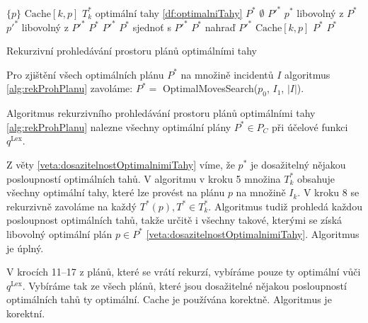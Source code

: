 \begin{algorithm}[H]
  \begin{algorithmic}[1]
      \State \Return $\{ p \}$
      \State \Return $\text{Cache}[k, p]$
    \EndIf
    \State $T^*_k$ \gets optimální tahy \ref{df:optimalniTahy}
    \State $P^*$ \gets $\emptyset$
      \State $P'^*$ \gets {}
      \State $p^*$ \gets libovolný z $P^*$
      \State $p'^*$ \gets libovolný z $P'^*$
        \State $P^*$ \gets $P'^*$ 
        \State $P^*$ sjednoť s $P'^*$
        \State $P^*$ nahraď $P'^*$
      \EndIf
    \EndFor
    \State $\text{Cache}[k, p]$ \gets $P^*$
    \State \Return $P^*$
  \EndFunction
  \end{algorithmic}
  \caption{Rekurzivní prohledávání prostoru plánů optimálními tahy}
  \label{alg:rekProhPlanu}
\end{algorithm}

Pro zjištění všech optimálních plánu $P^*$ na množině incidentů $I$ algoritmus \ref{alg:rekProhPlanu} zavoláme: $P^* = $ OptimalMovesSearch($p_0$, $I_1$, $|I|$).

\begin{veta}\label{}
  Algoritmus rekurzivního prohledávání prostoru plánů optimálními tahy \ref{alg:rekProhPlanu} nalezne všechny optimální plány $P^* \in P_C$ při účelové funkci $q^{\text{Lex}}$.
\end{veta}
\begin{dukaz}
  Z věty \ref{veta:dosazitelnostOptimalnimiTahy} víme, že $p^*$ je dosažitelný nějakou posloupností optimálních tahů. 
  V algoritmu v kroku 5 množina $T^*_k$ obsahuje všechny optimální tahy, které lze provést na plánu $p$ na množině $I_k$.
  V kroku 8 se rekurzivně zavoláme na každý $T^*(p), T^* \in T^*_k$.
  Algoritmus tudiž prohledá každou posloupnost optimálních tahů, takže určitě i všechny takové, kterými se získá libovolný optimální plán $p \in P^*$ \ref{veta:dosazitelnostOptimalnimiTahy}.
  Algoritmus je úplný.

  V krocích 11--17 z plánů, které se vrátí rekurzí, vybíráme pouze ty optimální vůči $q^{\text{Lex}}$.
  Vybíráme tak ze všech plánů, které jsou dosažitelné nějakou posloupností optimálních tahů ty optimální.
  Cache je používána korektně.
  Algoritmus je korektní.
\end{dukaz}

